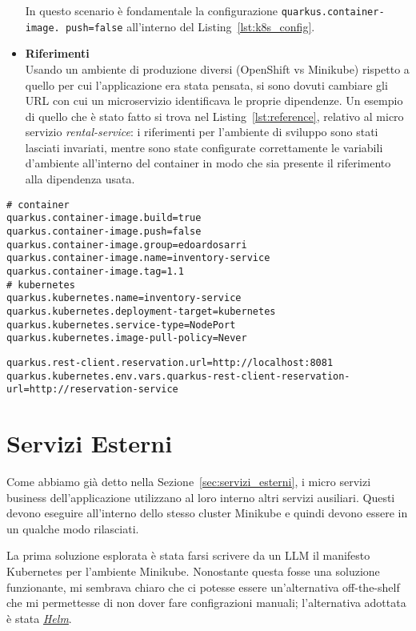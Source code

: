 \begin{itemize}
        In questo scenario è fondamentale la configurazione \texttt{quarkus.container-image. \allowbreak push=false} all'interno del Listing~\ref{lst:k8s_config}.
    \item \textbf{Riferimenti} \\
        Usando un ambiente di produzione diversi (OpenShift vs Minikube) rispetto a quello per cui l'applicazione era stata pensata, si sono dovuti cambiare gli URL con cui un microservizio identificava le proprie dipendenze. Un esempio di quello che è stato fatto si trova nel Listing~\ref{lst:reference}, relativo al micro servizio \textit{rental-service}: i riferimenti per l'ambiente di sviluppo sono stati lasciati invariati, mentre sono state configurate correttamente le variabili d'ambiente all'interno del container in modo che sia presente il riferimento alla dipendenza usata.
\end{itemize}

\begin{lstlisting}[caption=Kubernetes and Docker Configuration, label=lst:k8s_config]
# container
quarkus.container-image.build=true
quarkus.container-image.push=false
quarkus.container-image.group=edoardosarri
quarkus.container-image.name=inventory-service
quarkus.container-image.tag=1.1
# kubernetes
quarkus.kubernetes.name=inventory-service
quarkus.kubernetes.deployment-target=kubernetes
quarkus.kubernetes.service-type=NodePort
quarkus.kubernetes.image-pull-policy=Never
\end{lstlisting}

\begin{lstlisting}[caption=Reference in different environments, label=lst:reference]
quarkus.rest-client.reservation.url=http://localhost:8081
quarkus.kubernetes.env.vars.quarkus-rest-client-reservation-url=http://reservation-service
\end{lstlisting}

\section{Servizi Esterni}
Come abbiamo già detto nella Sezione~\ref{sec:servizi_esterni}, i micro servizi business dell'applicazione utilizzano al loro interno altri servizi ausiliari. Questi devono eseguire all'interno dello stesso cluster Minikube e quindi devono essere in un qualche modo rilasciati.

La prima soluzione esplorata è stata farsi scrivere da un LLM il manifesto Kubernetes per l'ambiente Minikube. Nonostante questa fosse una soluzione funzionante, mi sembrava chiaro che ci potesse essere un'alternativa off-the-shelf che mi permettesse di non dover fare configrazioni manuali; l'alternativa adottata è stata \href{https://helm.sh}{\textit{Helm}}.

